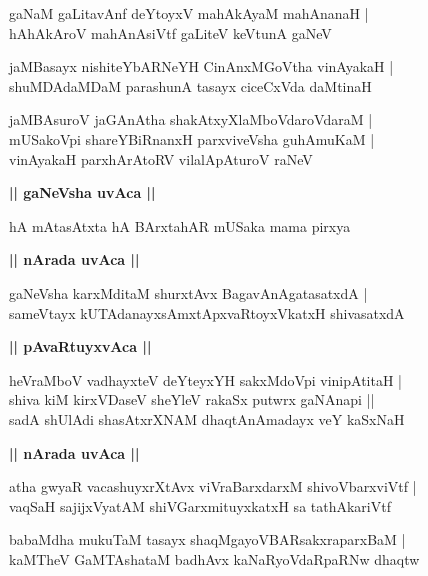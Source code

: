 \documentclass[twoside,12pt,openright]{book}
\newcounter{shloka}[chapter]
\def\uvaca#1{\centerline{{\large\textbf{#1}}}}
\begin{document}
\begin{shloka}%
gaNaM gaLitavAnf deYtoyxV mahAkAyaM mahAnanaH |\\
hAhAkAroV mahAnAsiVtf gaLiteV keVtunA gaNeV 
\end{shloka}

\begin{shloka}%
jaMBasayx nishiteYbARNeYH CinAnxMGoVtha vinAyakaH |\\
shuMDAdaMDaM parashunA tasayx ciceCxVda daMtinaH 
\end{shloka}

\begin{shloka}%
jaMBAsuroV jaGAnAtha shakAtxyXlaMboVdaroVdaraM |\\
mUSakoVpi shareYBiRnanxH parxviveVsha guhAmuKaM |\\
vinAyakaH parxhArAtoRV vilalApAturoV raNeV 
\end{shloka}

\uvaca{|| gaNeVsha uvAca ||}

\begin{shloka}%
hA mAtasAtxta hA BArxtahAR mUSaka mama pirxya 
\end{shloka}

\uvaca{|| nArada uvAca ||}

\begin{shloka}%
gaNeVsha karxMditaM shurxtAvx BagavAnAgatasatxdA |\\
sameVtayx kUTAdanayxsAmxtApxvaRtoyxVkatxH shivasatxdA 
\end{shloka}

\uvaca{|| pAvaRtuyxvAca ||}

\begin{shloka}%
heVraMboV vadhayxteV deYteyxYH sakxMdoVpi vinipAtitaH |\\
shiva kiM kirxVDaseV sheYleV rakaSx putwrx gaNAnapi ||\\
sadA shUlAdi shasAtxrXNAM dhaqtAnAmadayx veY kaSxNaH 
\end{shloka}

\uvaca{|| nArada uvAca ||}

\begin{shloka}%
atha gwyaR vacashuyxrXtAvx viVraBarxdarxM shivoVbarxviVtf |\\
vaqSaH sajijxVyatAM shiVGarxmituyxkatxH sa tathAkariVtf 
\end{shloka}

\begin{shloka}%
babaMdha mukuTaM tasayx shaqMgayoVBARsakxraparxBaM |\\
kaMTheV GaMTAshataM badhAvx kaNaRyoVdaRpaRNw dhaqtw 
\end{shloka}
\end{document}
